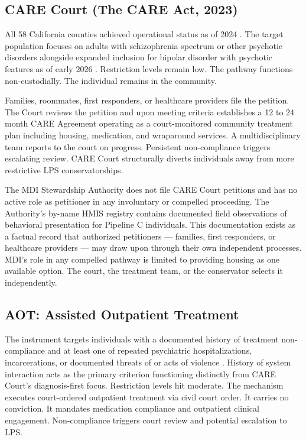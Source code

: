 \documentclass[12pt, letterpaper]{article}
\begin{document}
\subsection{CARE Court (The CARE Act, 2023)}

All 58 California counties achieved operational status as of 2024 \citep{care_act_2022}. The target population focuses on adults with schizophrenia spectrum or other psychotic disorders alongside expanded inclusion for bipolar disorder with psychotic features as of early 2026 \citep{care_act_sb14_2024}. Restriction levels remain low. The pathway functions non-custodially. The individual remains in the community.

Families, roommates, first responders, or healthcare providers file the petition. The Court reviews the petition and upon meeting criteria establishes a 12 to 24 month CARE Agreement operating as a court-monitored community treatment plan including housing, medication, and wraparound services. A multidisciplinary team reports to the court on progress. Persistent non-compliance triggers escalating review. CARE Court structurally diverts individuals away from more restrictive LPS conservatorships.

The MDI Stewardship Authority does not file CARE Court petitions and has no active role as petitioner in any involuntary or compelled proceeding. The Authority's by-name HMIS registry contains documented field observations of behavioral presentation for Pipeline C individuals. This documentation exists as a factual record that authorized petitioners — families, first responders, or healthcare providers — may draw upon through their own independent processes. MDI's role in any compelled pathway is limited to providing housing as one available option. The court, the treatment team, or the conservator selects it independently.

\clearpage

\subsection{AOT: Assisted Outpatient Treatment}

The instrument targets individuals with a documented history of treatment non-compliance and at least one of repeated psychiatric hospitalizations, incarcerations, or documented threats of or acts of violence \citep{lauras_law_2002}. History of system interaction acts as the primary criterion functioning distinctly from CARE Court's diagnosis-first focus. Restriction levels hit moderate. The mechanism executes court-ordered outpatient treatment via civil court order. It carries no conviction. It mandates medication compliance and outpatient clinical engagement. Non-compliance triggers court review and potential escalation to LPS.
\end{document}
